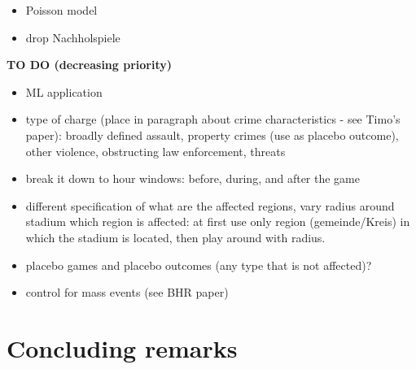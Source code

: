 \documentclass[11pt, a4paper]{article} %
\begin{document}
\begin{itemize}
	\item Poisson model
	\item drop Nachholspiele
\end{itemize}







\bigskip
{\color{red}\textbf{TO DO (decreasing priority)}}
\begin{itemize}
	\item ML application
	\item type of charge (place in paragraph about crime characteristics - see Timo's paper): broadly defined assault, property crimes (use as placebo outcome), other violence, obstructing law enforcement, threats
	\item break it down to hour windows: before, during, and after the game
	\item different specification of what are the affected regions, vary radius around stadium which region is affected: at first use only region (gemeinde/Kreis) in which the stadium is located, then play around with radius.
	\item placebo games and placebo outcomes (any type that is not affected)?
	\item control for mass events (see BHR paper)
\end{itemize}

































\bigskip
\section{Concluding remarks}\label{sec_soc_ext:conclusion}
\end{document}

